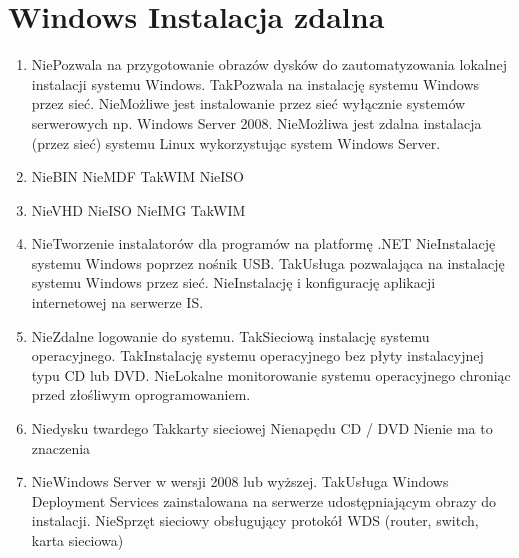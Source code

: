 
\newpage
\section{Windows Instalacja zdalna}
	\begin{enumerate}
		\item {}%
		{Nie}{Pozwala na przygotowanie obrazów dysków do zautomatyzowania lokalnej instalacji systemu Windows.}%
		{Tak}{Pozwala na instalację systemu Windows przez sieć.}%
		{Nie}{Możliwe jest instalowanie przez sieć wyłącznie systemów serwerowych np. Windows Server 2008.}%
		{Nie}{Możliwa jest zdalna instalacja (przez sieć) systemu Linux wykorzystując system Windows Server.}
		\item {}%
		{Nie}{BIN}%
		{Nie}{MDF}%
		{Tak}{WIM}%
		{Nie}{ISO}
		\item {}%
		{Nie}{VHD}%
		{Nie}{ISO}%
		{Nie}{IMG}%
		{Tak}{WIM}
		\item {}%
		{Nie}{Tworzenie instalatorów dla programów na platformę .NET}%
		{Nie}{Instalację systemu Windows poprzez nośnik USB.}%
		{Tak}{Usługa pozwalająca na instalację systemu Windows przez sieć.}%
		{Nie}{Instalację i konfigurację aplikacji internetowej na serwerze IS.}
		\item {}%
		{Nie}{Zdalne logowanie do systemu.}%
		{Tak}{Sieciową instalację systemu operacyjnego.}%
		{Tak}{Instalację systemu operacyjnego bez płyty instalacyjnej typu CD lub DVD.}%
		{Nie}{Lokalne monitorowanie systemu operacyjnego chroniąc przed złośliwym oprogramowaniem.}
		\item {}%
		{Nie}{dysku twardego}%
		{Tak}{karty sieciowej}%
		{Nie}{napędu CD / DVD}%
		{Nie}{nie ma to znaczenia}
		\item {}%
		{Nie}{Windows Server w wersji 2008 lub wyższej.}%
		{Tak}{Usługa Windows Deployment Services zainstalowana na serwerze udostępniającym obrazy do instalacji.}%
		{Nie}{Sprzęt sieciowy obsługujący protokół WDS (router, switch, karta sieciowa)}%

\end{enumerate}
